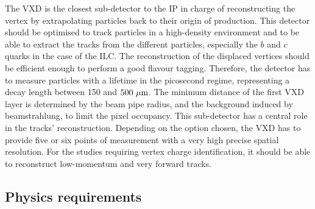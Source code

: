     The \gls{VXD} is the closest sub-detector to the \acrfull{IP} in charge of reconstructing the vertex by extrapolating particles back to their origin of production. 
    This detector should be optimised to track particles in a high-density environment and to be able to extract the tracks from the different particles, especially the $b$ and $c$ quarks in the case of the \gls{ILC}.
    The reconstruction of the displaced vertices should be efficient enough to perform a good flavour tagging.
    Therefore, the detector has to measure particles with a lifetime in the picosecond regime, representing a decay length between 150 and $500~\rm{\mu m}$.
    The minimum distance of the first \gls{VXD} layer is determined by the beam pipe radius, and the background induced by beamstrahlung, to limit the pixel occupancy.
    This sub-detector has a central role in the tracks' reconstruction.
    Depending on the option chosen, the \gls{VXD} has to provide five or six points of measurement with a very high precise spatial resolution.
    For the studies requiring vertex charge identification, it should be able to reconstruct low-momentum and very forward tracks.

   \subsection{Physics requirements}


